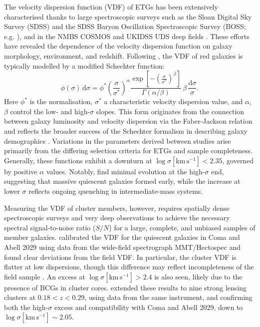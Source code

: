 \documentclass{aa}
\begin{document}
The velocity dispersion function (VDF) of ETGs has been extensively characterised thanks to large spectroscopic surveys such as the Sloan Digital Sky Survey (SDSS) and the SDSS Baryon Oscillation Spectroscopic Survey (BOSS; e.g. \citealt{sheth03,mitchell05, choi07, bernardi10, monterodorta17, sohn17a}), and in the NMBS COSMOS and UKIDSS UDS deep fields  \citep{bezanson12}. These efforts have revealed the dependence of the velocity dispersion function on galaxy morphology, environment, and redshift. Following \citet{sheth03}, the VDF of red galaxies is typically modelled by a modified Schechter function:
\begin{equation}\label{modsch}
\phi(\sigma)\, \mathrm{d}\sigma = \phi^* \left(\frac{\sigma}{\sigma^*}\right)^\alpha 
\frac{\exp\left[- \left(\frac{\sigma}{\sigma^*}\right)^\beta \right]}{\Gamma(\alpha/\beta)} 
\, \beta\, \frac{\mathrm{d}\sigma}{\sigma}.
\end{equation}
Here $\phi^*$ is the normalisation, $\sigma^*$ a characteristic velocity dispersion value, and $\alpha$, $\beta$ control the low- and high-$\sigma$ slopes. This form originates from the connection between galaxy luminosity and velocity dispersion via the Faber-Jackson relation \citep{faber76} and reflects the broader success of the Schechter formalism in describing galaxy demographics \citep{schechter76}. Variations in the parameters derived between studies arise primarily from the differing selection criteria for ETGs and sample completeness. Generally, these functions exhibit a downturn at $\log \sigma [\mathrm{km\,s^{-1}}] < 2.35$, governed by positive $\alpha$ values. Notably, \citet{bezanson12} find minimal evolution at the high-$\sigma$ end, suggesting that massive quiescent galaxies formed early, while the increase at lower $\sigma$ reflects ongoing quenching in intermediate-mass systems.

Measuring the VDF of cluster members, however, requires spatially dense spectroscopic surveys and very deep observations to achieve the necessary spectral signal-to-noise ratio ($S/N$) for a large, complete, and unbiased samples of member galaxies. \citet{sohn17} calibrated the VDF for the quiescent galaxies in Coma and Abell 2029  using data from the wide-field spectrograph MMT/Hectospec and found clear deviations from the field VDF. In particular, the cluster VDF is flatter at low dispersions, though this difference may reflect incompleteness of the field sample \citep{sohn17}. An excess at $\log \sigma[\mathrm{km\,s^{-1}}] > 2.4$ is also seen, likely due to the presence of BCGs in cluster cores. \citet{sohn20} extended these results to nine strong lensing clusters at $0.18 < z < 0.29$, using data from the same instrument, and confirming both the high-$\sigma$ excess and compatibility with Coma and Abell 2029, down to $\log \sigma [\mathrm{km\,s^{-1}}] \sim 2.05$.
\end{document}
